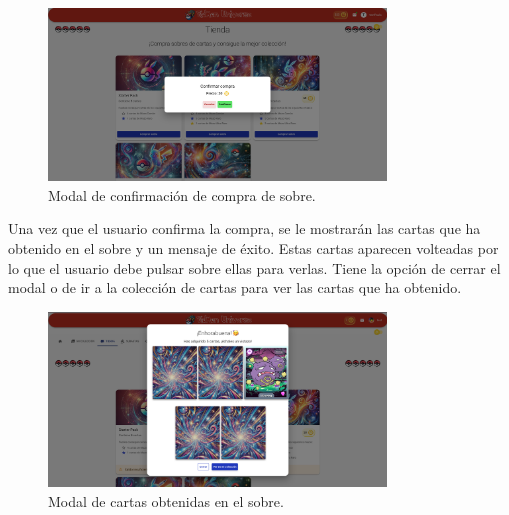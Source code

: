 \begin{figure}[H]
    \centering
    \includegraphics[width=0.8\textwidth]{figures/6-Analisis/6-Interfaz/interfaz/compra_sobre1.png}
    \caption{Modal de confirmación de compra de sobre.}
    \label{fig:interfaz-compra-sobre}
\end{figure}

Una vez que el usuario confirma la compra, se le mostrarán las cartas que ha obtenido en el sobre y un mensaje de éxito.
Estas cartas aparecen volteadas por lo que el usuario debe pulsar sobre ellas para verlas.
Tiene la opción de cerrar el modal o de ir a la colección de cartas para ver las cartas que ha obtenido.

\begin{figure}[H]
    \centering
    \includegraphics[width=0.8\textwidth]{figures/6-Analisis/6-Interfaz/interfaz/compra_sobre.png}
    \caption{Modal de cartas obtenidas en el sobre.}
    \label{fig:interfaz-sobre-comprado}
\end{figure}


